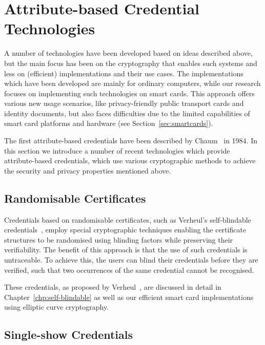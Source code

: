 \section{Attribute-based Credential Technologies}

A number of technologies have been developed based on ideas described above, but
the main focus has been on the cryptography that enables such systems and less
on (efficient) implementations and their use cases. The implementations which
have been developed are mainly for ordinary computers, while our research
focuses on implementing such technologies on smart cards. This approach offers
various new usage scenarios, like privacy-friendly public transport cards and
identity documents, but also faces difficulties due
to the limited capabilities of smart card platforms and hardware (see
Section~\ref{sec:smartcards}).

The first attribute-based credentials have been described by
Chaum~\cite{Chaum1985} in 1984. In this section we introduce a number of recent
technologies which provide attribute-based credentials, which use various
cryptographic methods to achieve the security and privacy properties mentioned
above.

\subsection{Randomisable Certificates}

Credentials based on randomisable certificates,
such as Verheul's self-blindable credentials~\cite{Verheul01}, employ special
cryptographic techniques enabling the certificate structures to be randomised
using blinding factors while preserving their verifiability. The benefit of this
 approach is that the use of such credentials is
untraceable. To achieve this, the users can blind their credentials before they
are verified, such that two occurrences of the same credential cannot be
recognised.

These credentials, as proposed by Verheul~\cite{Verheul01}, are discussed in
detail in Chapter~\ref{chp:self-blindable} as well as our efficient smart card
implementations~\cite{BatinaHJMV10,HoepmanJV10} using elliptic curve
cryptography.

\subsection{Single-show Credentials}

